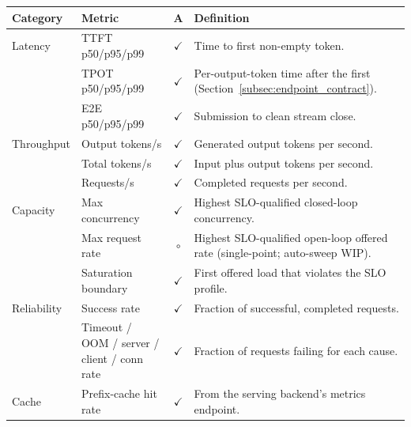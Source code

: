 
\newcommand{\cm}{$\checkmark$}   %
\newcommand{\pa}{$\circ$}        %

\begin{table}[t]
  \centering
  \small
  \renewcommand{\arraystretch}{1.15}
  \begin{tabular}{@{}p{} p{} c p{}@{}}
    \toprule
    \textbf{Category} & \textbf{Metric} & \textbf{A} & \textbf{Definition} \\
    \midrule
    Latency
      & TTFT p50/p95/p99 & \cm & Time to first non-empty token. \\
      & TPOT p50/p95/p99 & \cm & Per-output-token time after the first
        (Section~\ref{subsec:endpoint_contract}). \\
      & E2E p50/p95/p99 & \cm & Submission to clean stream close. \\
    \midrule
    Throughput
      & Output tokens/s & \cm & Generated output tokens per second. \\
      & Total tokens/s & \cm & Input plus output tokens per second. \\
      & Requests/s & \cm & Completed requests per second. \\
    \midrule
    Capacity
      & Max concurrency & \cm & Highest SLO-qualified closed-loop concurrency. \\
      & Max request rate & \pa & Highest SLO-qualified open-loop offered rate (single-point; auto-sweep WIP). \\
      & Saturation boundary & \cm & First offered load that violates the SLO profile. \\
    \midrule
    Reliability
      & Success rate & \cm & Fraction of successful, completed requests. \\
      & Timeout / OOM / server / client / conn rate & \cm & Fraction of requests failing for each cause. \\
    \midrule
    Cache
      & Prefix-cache hit rate & \cm & From the serving backend's metrics endpoint. \\

\end{tabular}
\end{table}
